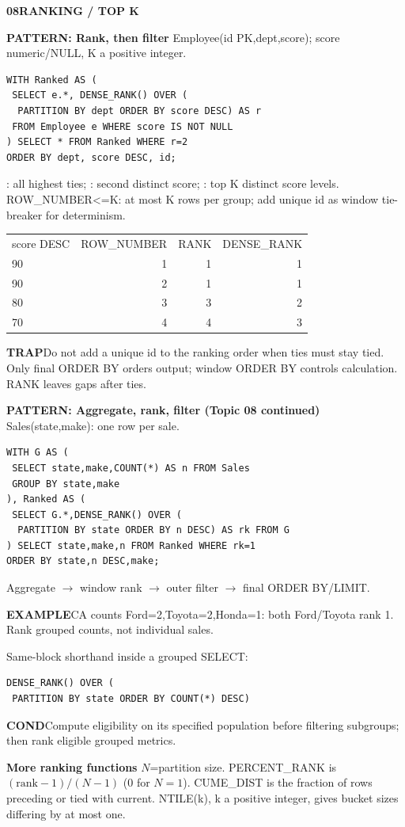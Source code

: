 \documentclass[a4paper]{article}
\newcommand{\sqlfont}{\ttfamily}
\newcommand{\bodyfontsize}{5.55}
\newcommand{\bodyleading}{5.3}
\newlength{\gutter}\setlength{\gutter}{1.5mm}
\newcommand{\bodylineskiplimit}{-2pt}
\newcommand{\bodystyle}{%
  \fontsize{\bodyfontsize}{\bodyleading}\selectfont\setlength{\lineskiplimit}{\bodylineskiplimit}\RaggedRight
  \setlength{\abovedisplayskip}{.5pt}\setlength{\belowdisplayskip}{.5pt}%
  \setlength{\abovedisplayshortskip}{.3pt}\setlength{\belowdisplayshortskip}{.3pt}}
\newcommand{\topic}[2]{\par\addvspace{.45pt}\nointerlineskip%
  \begingroup\setlength{\fboxsep}{0.35pt}%
  \noindent\colorbox{structure}{\parbox{\dimexpr\linewidth-2\fboxsep\relax}{%
    \color{white}\fontsize{6.45}{6.8}\selectfont\bfseries #1\enspace #2}}%
  \endgroup\par\nobreak\vspace{.55pt}\nointerlineskip\nobreak}
\newenvironment{topicblock}
  {\par\bodystyle}
  {\par}
\newcommand{\key}[1]{\par\textcolor{structure}{\textbf{#1}}\enspace}
\newcommand{\note}[4]{\par\nointerlineskip\vspace{.25pt}\begingroup\setlength{\fboxsep}{0.1pt}%
  \noindent\colorbox{#1}{\parbox{\dimexpr\linewidth-2\fboxsep\relax}{%
    \RaggedRight\textcolor{#2}{\textbf{#3}}\enspace #4}}%
  \endgroup\par\nointerlineskip\vspace{.25pt}}
\newcommand{\cond}[1]{\note{conditionbg}{condition}{COND}{#1}}
\newcommand{\trap}[1]{\note{warningbg}{warning}{TRAP}{#1}}
\newcommand{\ex}[1]{\note{examplebg}{example}{EXAMPLE}{#1}}
\newcommand{\pattern}[1]{\key{PATTERN: #1}}
\newcommand{\sql}[1]{{\sqlfont\color{sqltext}\detokenize{#1}}}
\newlength{\sheetwidth}
\newenvironment{sheetcolumns}[1]
  {\noindent\begin{minipage}[t]{#1\sheetwidth}\vspace{0pt}\bodystyle\ignorespaces}
  {\end{minipage}\par}
\newcommand{\nextcol}[1]{\end{minipage}\hspace{\gutter}%
  \begin{minipage}[t]{#1\sheetwidth}\vspace{0pt}\bodystyle\ignorespaces}
\begin{document}
\begin{sheetcolumns}{.254}
\begin{topicblock}
\topic{08}{RANKING / TOP K}
\pattern{Rank, then filter} Employee(id PK,dept,score); score numeric/NULL, K a positive integer.
\begin{lstlisting}
WITH Ranked AS (
 SELECT e.*, DENSE_RANK() OVER (
  PARTITION BY dept ORDER BY score DESC) AS r
 FROM Employee e WHERE score IS NOT NULL
) SELECT * FROM Ranked WHERE r=2
ORDER BY dept, score DESC, id;
\end{lstlisting}
\sql{r=1}: all highest ties; \sql{r=2}: second distinct score; \sql{r<=K}: top K distinct score levels. ROW\_NUMBER<=K: at most K rows per group; add unique id as window tie-breaker for determinism.
\par{\centering\begin{tabular}{@{}lrrr@{}}
score DESC & ROW\_NUMBER & RANK & DENSE\_RANK\\
90 & 1 & 1 & 1\\90 & 2 & 1 & 1\\80 & 3 & 3 & 2\\70 & 4 & 4 & 3
\end{tabular}\par}
\trap{Do not add a unique id to the ranking order when ties must stay tied. Only final ORDER BY orders output; window ORDER BY controls calculation. RANK leaves gaps after ties.}
\end{topicblock}


\nextcol{.235}
\begin{topicblock}
\pattern{Aggregate, rank, filter (Topic 08 continued)}
Sales(state,make): one row per sale.
\begin{lstlisting}
WITH G AS (
 SELECT state,make,COUNT(*) AS n FROM Sales
 GROUP BY state,make
), Ranked AS (
 SELECT G.*,DENSE_RANK() OVER (
  PARTITION BY state ORDER BY n DESC) AS rk FROM G
) SELECT state,make,n FROM Ranked WHERE rk=1
ORDER BY state,n DESC,make;
\end{lstlisting}
Aggregate $\to$ window rank $\to$ outer filter $\to$ final ORDER BY/LIMIT.
\ex{CA counts Ford=2,Toyota=2,Honda=1: both Ford/Toyota rank 1. Rank grouped counts, not individual sales.}
Same-block shorthand inside a grouped SELECT:
\begin{lstlisting}
DENSE_RANK() OVER (
 PARTITION BY state ORDER BY COUNT(*) DESC)
\end{lstlisting}
\cond{Compute eligibility on its specified population before filtering subgroups; then rank eligible grouped metrics.}
\key{More ranking functions}
$N$=partition size. PERCENT\_RANK is $(\mathrm{rank}-1)/(N-1)$ (0 for $N=1$). CUME\_DIST is the fraction of rows preceding or tied with current. NTILE(k), k a positive integer, gives bucket sizes differing by at most one.
\end{topicblock}


\end{sheetcolumns}
\end{document}
